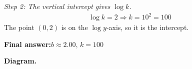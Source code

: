 \documentclass[11pt]{article}
\begin{document}
\textit{Step 2: The vertical intercept gives \( \log k \).}
\[\begin{gathered}
\log k = 2 \Rightarrow k = 10^2 = 100
\end{gathered}\]
The point \( (0, 2) \) is on the \( \log y \)-axis, so it is the intercept.

\begin{answerbox}
\textbf{Final answer:}\quad \(\displaystyle  b \approx 2.00 \), \(\displaystyle  k = 100 \)
\end{answerbox}
\textbf{Diagram.}

\begin{center}
\end{center}
\end{document}

